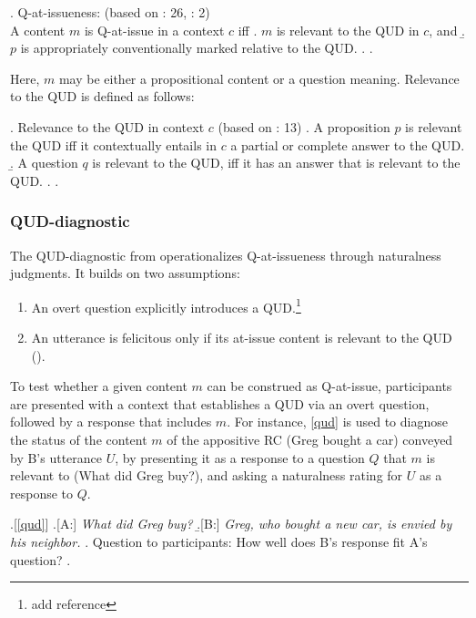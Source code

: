 \documentclass[times,linguex,xcolor]{glossa}
\begin{document}
    \ex. \label{def:qai}%
      Q-at-issueness: \hfill (based on \citealt{simons_what_2010}: 26, \citealt{koev_notions_2018}: 2)\\
      A content $m$ is Q-at-issue in a context $c$ iff
      \a. \label{def:qai-relevant}%
        $m$ is relevant to the QUD in $c$, and
      \b.  \label{def:qai-conventional}%
        $p$ is appropriately conventionally marked relative to the QUD.
      \z. 
    \z.

    Here, $m$ may be either a propositional content or a question meaning. Relevance to the QUD is defined as follows:

    \ex. Relevance to the QUD in context $c$ \hfill (based on \citealt{simons_what_2010}: 13)
      \a. A proposition $p$ is relevant the QUD iff it contextually entails in $c$ a partial or complete answer to the QUD.
      \b. A question $q$ is relevant to the QUD, iff it has an answer that is relevant to the QUD.
      \z.
    \z.

    \subsubsection{QUD-diagnostic}
    The QUD-diagnostic from \citealt{tonhauser_diagnosing_2012} operationalizes Q-at-issueness through naturalness judgments. It builds on two assumptions:
    \begin{enumerate}
      \item An overt question explicitly introduces a QUD.\footnote{add reference}
      \item An utterance is felicitous only if its at-issue content is relevant to the QUD (\citealt{amaral_review_2007,tonhauser_diagnosing_2012}).
    \end{enumerate}

    \noindent To test whether a given content $m$ can be construed as Q-at-issue, participants are presented with a context that establishes a QUD via an overt question, followed by a response that includes $m$. For instance, \ref{qud} is used to diagnose the status of the content $m$ of the appositive RC (Greg bought a car) conveyed by B's utterance $U$, by presenting it as a response to a question $Q$ that $m$ is relevant to (What did Greg buy?), and asking a naturalness rating for $U$ as a response to $Q$.

    \ex.[\ref{qud}]
      \a.[A:] \emph{What did Greg buy?}
      \b.[B:] \emph{Greg, who bought a new car, is envied by his neighbor.}
      \z.
      Question to participants: How well does B's response fit A's question?
    \z.
\end{document}
